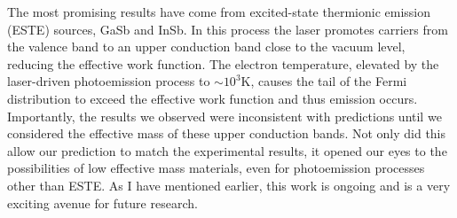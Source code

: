 The most promising results have come from excited-state thermionic emission (ESTE) sources, GaSb and InSb.
In this process the laser promotes carriers from the valence band to an upper conduction band close to the vacuum level, reducing the effective work function.
The electron temperature, elevated by the laser-driven photoemission process to $\sim10^3$K, causes the tail of the Fermi distribution to exceed the effective work function and thus emission occurs.
Importantly, the results we observed were inconsistent with predictions until we considered the effective mass of these upper conduction bands.
Not only did this allow our prediction to match the experimental results, it opened our eyes to the possibilities of low effective mass materials, even for photoemission processes other than ESTE.
As I have mentioned earlier, this work is ongoing and is a very exciting avenue for future research.


